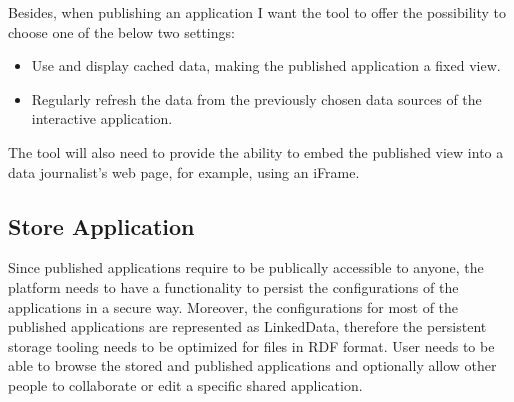 Besides, when publishing an application I want the tool to offer the possibility to choose one of the below two settings:

\begin{itemize}
\item Use and display cached data, making the published application a fixed view.
\item Regularly refresh the data from the previously chosen data sources of the interactive application.
\end{itemize}

The tool will also need to provide the ability to embed the published view into a data journalist's web page, for example, using an iFrame.

\subsection{Store Application}

Since published applications require to be publically accessible to anyone, the platform needs to have a functionality to persist the configurations of the applications in a secure way. Moreover, the configurations for most of the published applications are represented as LinkedData, therefore the persistent storage tooling needs to be optimized for files in RDF format. 
User needs to be able to browse the stored and published applications and optionally allow other people to collaborate or edit a specific shared application. 

